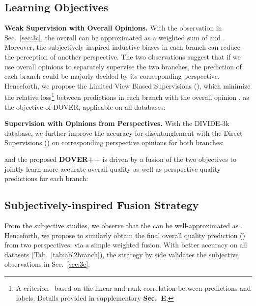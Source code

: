 \documentclass[10pt,twocolumn,letterpaper]{article}
\renewcommand{\paragraph}[1]{\noindent \textbf{#1}}
\newcommand{\blue}[1]{\textbf{\textcolor{mblue}{#1}}}
\newcommand{\green}[1]{\textcolor{mgreen}{#1}}
\begin{document}
\subsection{Learning Objectives}
\label{sec:objectives}

\paragraph{Weak Supervision with Overall Opinions.} With the observation in Sec.~\ref{sec:3c}, the overall  can be approximated as a weighted sum of \blue{} and \green{}. Moreover, the subjectively-inspired inductive biases in each branch can reduce the perception of another perspective. The two observations suggest that if we use overall opinions to separately supervise the two branches, the prediction of each branch could be majorly decided by its corresponding perspective. Henceforth, we propose the Limited View Biased Supervisions (), which minimize the relative loss\footnote{A criterion~\cite{qaloss} based on the linear and rank correlation between predictions and labels. Details provided in supplementary \textbf{Sec.~E}.} between predictions in each branch with the overall opinion , as the objective of DOVER, applicable on all databases:


\paragraph{Supervision with Opinions from Perspectives.} With the {DIVIDE-3k} database, we further improve the accuracy for disentanglement with the Direct Supervisions () on corresponding perspective opinions for both branches:

and the proposed \textbf{DOVER++} is driven by a fusion of the two objectives to jointly learn more accurate overall quality as well as perspective quality predictions for each branch:

\subsection{Subjectively-inspired Fusion Strategy} 
\label{sec:fusion}


From the subjective studies, we observe that the  can be well-approximated as . Henceforth, we propose to similarly obtain the final overall quality prediction () from two perspectives:  via a simple weighted fusion. With better accuracy on all datasets (Tab.~\ref{tab:abl2branch}), the strategy by side validates the subjective observations in Sec.~\ref{sec:3c}. 
\end{document}
